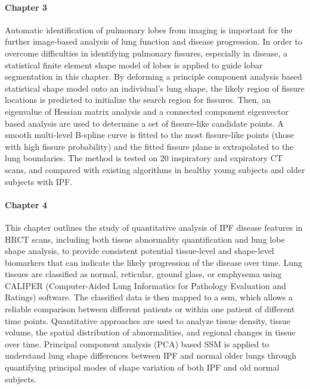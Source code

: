 \paragraph{Chapter 3} Automatic identification of pulmonary lobes from imaging is important for the further image-based analysis of lung function and disease progression. In order to overcome difficulties in identifying pulmonary fissures, especially in disease, a statistical finite element shape model of lobes is applied to guide lobar segmentation in this chapter. By deforming a principle component analysis based statistical shape model onto an individual’s lung shape, the likely region of fissure locations is predicted to initialize the search region for fissures. Then, an eigenvalue of Hessian matrix analysis and a connected component eigenvector based analysis are used to determine a set of fissure-like candidate points. A smooth multi-level B-spline curve is fitted to the most fissure-like points (those with high fissure probability) and the fitted fissure plane is extrapolated to the lung boundaries. The method is tested on 20 inspiratory and expiratory CT scans, and compared with existing algorithms in healthy young subjects and older subjects with IPF.

\paragraph{Chapter 4} This chapter outlines the study of quantitative analysis of IPF disease features in HRCT scans, including both tissue abnormality quantification and lung lobe shape analysis, to provide consistent potential tissue-level and shape-level biomarkers that can indicate the likely progression of the disease over time. Lung tissues are classified as normal, reticular, ground glass, or emphysema using CALIPER (Computer-Aided Lung Informatics for Pathology Evaluation and Ratings) software. The classified data is then mapped to a \gls{ssm}, which allows a reliable comparison between different patients or within one patient of different time points. Quantitative approaches are used to analyze tissue density, tissue volume, the spatial distribution of abnormalities, and regional changes in tissue over time. Principal component analysis (PCA) based SSM is applied to understand lung shape differences between IPF and normal older lungs through quantifying principal modes of shape variation of both IPF and old normal subjects. 
